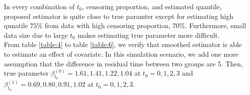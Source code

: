 \documentclass[titlepage,english,12pt]{article}
\begin{document}
	In every combination of $t_0$, censoring proportion, and estimated quantile, proposed estimator is quite close to true paramter except for estimating high qunatile $75\%$ from data with high censoring proportion, $70\%$. Furthermore, small data size due to large $t_0$ makes estimating true parameter more difficult.\\
	
	From table \ref{table:4} to table \ref{table:6}, we verify that smoothed estimator is able to estimate an effect of covariate. In this simulation scenario, we add one more assumption that the difference in residual time between two groups are 5. Then, true parameter $\beta_{t_0}^{(0)} = 1.61, 1.41, 1.22, 1.04$ at $t_0 = 0, 1, 2, 3$ and $\beta_{t_0}^{(1)} = 0.69, 0.80, 0.91, 1.02$ at $t_0 = 0, 1, 2, 3$.

\end{document}
